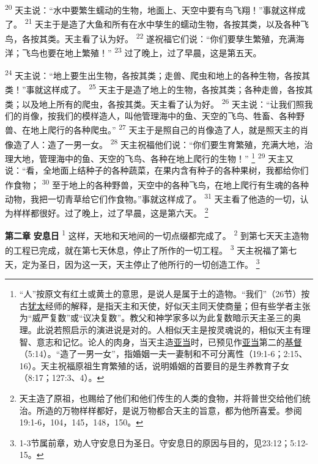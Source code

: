 \textsuperscript{20}
天主说：“水中要繁生蠕动的生物，地面上、天空中要有鸟飞翔！”事就这样成了。
\textsuperscript{21}
天主于是造了大鱼和所有在水中孳生的蠕动生物，各按其类，以及各种飞鸟，各按其类。天主看了认为好。
\textsuperscript{22}
遂祝福它们说：“你们要孳生繁殖，充满海洋；飞鸟也要在地上繁殖！”
\textsuperscript{23}
过了晚上，过了早晨，这是第五天。

\textsuperscript{24}
天主说：“地上要生出生物，各按其类；走兽、爬虫和地上的各种生物，各按其类！”事就这样成了。
\textsuperscript{25}
天主于是造了地上的生物，各按其类；各种走兽，各按其类；以及地上所有的爬虫，各按其类。天主看了认为好。
\textsuperscript{26}
天主说：“让我们照我们的肖像，按我们的模样造人，叫他管理海中的鱼、天空的飞鸟、牲畜、各种野兽、在地上爬行的各种爬虫。”
\textsuperscript{27}
天主于是照自己的肖像造了人，就是照天主的肖像造了人：造了一男一女。
\textsuperscript{28}
天主祝福他们说：“你们要生育繁殖，充满大地，治理大地，管理海中的鱼、天空的飞鸟、各种在地上爬行的生物！”
\footnote{“人”按原文有红土或黄土的意思，是说人是属于土的造物。“我们”（26节）按古\uline{犹太}经师的解释，是指天主和天使，好似天主同天使商量；但有些学者主张为“威严复数”或“议决复数”。教父和神学家多以为此复数暗示天主圣三的奥理。此说若照启示的演进说是对的。人相似天主是按灵魂说的，相似天主有理智、意志和记忆。论人的肉身，当天主造\uline{亚当}时，已预见作\uline{亚当}第二的\uline{基督}（5:14）。“造了一男一女”，指婚姻一夫一妻制和不可分离性（19:1-6；2:15、16）。天主祝福原祖生育繁殖的话，说明婚姻的首要目的是生养教育子女（8:17；127:3、4）。}
\textsuperscript{29}
天主又说：“看，全地面上结种子的各种蔬菜，在果内含有种子的各种果树，我都给你们作食物；
\textsuperscript{30}
至于地上的各种野兽，天空中的各种飞鸟，在地上爬行有生魂的各种动物，我把一切青草给它们作食物。”事就这样成了。
\textsuperscript{31}
天主看了他造的一切，认为样样都很好。过了晚上，过了早晨，这是第六天。
\footnote{天主造了原祖，也赐给了他们和他们传生的人类的食物，并将普世交给他们统治。所造的万物样样都好，是说万物都合天主的旨意，都为他所喜爱。参阅19:1-6，104，145，148，150。}

\textbf{第二章 }
\textbf{安息日 }
\textsuperscript{1}
这样，天地和天地间的一切点缀都完成了。
\textsuperscript{2}
到第七天天主造物的工程已完成，就在第七天休息，停止了所作的一切工程。
\textsuperscript{3}
天主祝福了第七天，定为圣日，因为这一天，天主停止了他所行的一切创造工作。
\footnote{1-3节属前章，劝人守安息日为圣日。守安息日的原因与目的，见23:12；5:12-15。}

